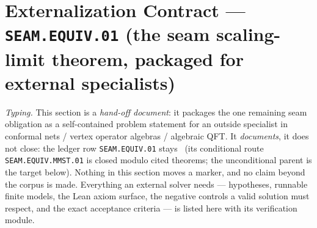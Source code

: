 \section*{Externalization Contract --- \texttt{SEAM.EQUIV.01} (the seam scaling-limit theorem, packaged for external specialists)}
\noindent\emph{Typing.} This section is a \emph{hand-off document}: it packages the one remaining
seam obligation as a self-contained problem statement for an outside specialist in conformal
nets / vertex operator algebras / algebraic QFT. It \emph{documents}, it does not close: the
ledger row \texttt{SEAM.EQUIV.01} stays \mO\ (its conditional route \texttt{SEAM.EQUIV.MMST.01}
is closed modulo cited theorems; the unconditional parent is the target below). Nothing in this
section moves a marker, and no claim beyond the corpus is made. Everything an external solver
needs --- hypotheses, runnable finite models, the Lean axiom surface, the negative controls a
valid solution must respect, and the exact acceptance criteria --- is listed here with its
verification module.

